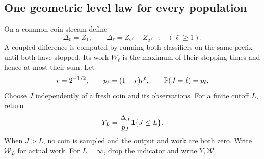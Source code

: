 \subsection{One geometric level law for every population}
On a common coin stream define
\begin{equation}\label{eq:deltas}
 \Delta_0=Z_1,\qquad \Delta_\ell=Z_{2^\ell}-Z_{2^{\ell-1}}
 \quad(\ell\ge1).
\end{equation}
A coupled difference is computed by running both classifiers on the same
prefix until both have stopped. Its work $W_\ell$ is the maximum of their
stopping times and hence at most their sum. Let
\begin{equation}\label{eq:p-level}
 r=2^{-1/2},\qquad p_\ell=(1-r)r^\ell,\qquad
 \mathbb P(J=\ell)=p_\ell.
\end{equation}
Choose $J$ independently of a fresh coin and its observations. For a finite
cutoff $L$, return
\begin{equation}\label{eq:Y-cut}
 Y_L=\frac{\Delta_J}{p_J}\mathbf 1\{J\le L\}.
\end{equation}
When $J>L$, no coin is sampled and the output and work are both zero.
Write $\mathcal W_L$ for actual work. For $L=\infty$, drop the indicator
and write $Y,\mathcal W$.

